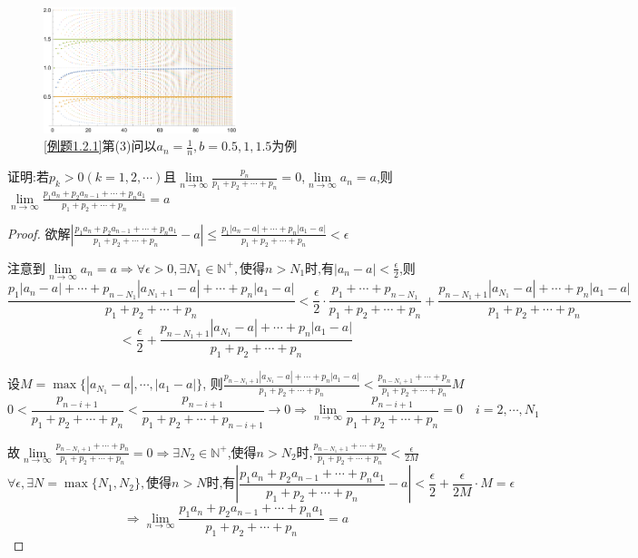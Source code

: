 \begin{figure}[H]
    \centering
    \includegraphics[width=0.5\textwidth]{../image/点列问题}
    \caption{\cref{例题1.2.1}第(3)问以$a_n=\frac{1}{n},b=0.5,1,1.5$为例}
\end{figure}

\begin{example}
    证明:若$p_k>0(k=1,2,\cdots)$且$\lim\limits_{n\to \infty}\frac{p_n}{p_1+p_2+\cdots+p_n}=0$,$\lim\limits_{n \to \infty} a_n=a$,则$\lim\limits_{n\to \infty}\frac{p_1a_n+p_2a_{n-1}+\cdots+p_na_1}{p_1+p_2+\cdots+p_n}=a$
\end{example}

\begin{proof}

    欲解$|\frac{p_1a_n+p_2a_{n-1}+\cdots+p_na_1}{p_1+p_2+\cdots+p_n}-a|\le \frac{p_1|a_n-a|+\cdots+p_n|a_1-a|}{p_1+p_2+\cdots+p_n}<\epsilon$

    注意到$\lim\limits_{n\to \infty} a_n=a \Longrightarrow\forall \epsilon>0,\exists N_1 \in \mathbb{N}^+,\mbox{使得}n>N_1\mbox{时,有}|a_n-a|<\frac{\epsilon}{2}$,则
    $$\frac{p_1|a_n-a|+\cdots+p_{n-N_1}|a_{N_1+1}-a|+\cdots+p_n|a_1-a|}{p_1+p_2+\cdots+p_n}< \frac{\epsilon}{2}\cdot \frac{p_1+\cdots+p_{n-N_1}}{p_1+p_2+\cdots+p_n}+\frac{p_{n-N_1+1}|a_{N_1}-a|+\cdots+p_n|a_1-a|}{p_1+p_2+\cdots+p_n}$$
    $$<\frac{\epsilon}{2}+\frac{p_{n-N_1+1}|a_{N_1}-a|+\cdots+p_n|a_1-a|}{p_1+p_2+\cdots+p_n}$$

    设$M=\max \{|a_{N_1}-a|,\cdots,|a_1-a|\}$,
    则$\frac{p_{n-N_1+1}|a_{N_1}-a|+\cdots+p_n|a_1-a|}{p_1+p_2+\cdots+p_n}<\frac{p_{n-N_1+1}+\cdots+p_n}{p_1+p_2+\cdots+p_n}M$
    \begin{equation*}
        0<\frac{p_{n-i+1}}{p_1+p_2+\cdots+p_n}<\frac{p_{n-i+1}}{p_1+p_2+\cdots+p_{n-i+1}}\to 0\Longrightarrow \lim\limits_{n\to \infty}\frac{p_{n-i+1}}{p_1+p_2+\cdots+p_n}=0\quad i=2,\cdots,N_1
    \end{equation*}

    故$\lim\limits_{n\to \infty} \frac{p_{n-N_1+1}+\cdots+p_n}{p_1+p_2+\cdots+p_n} = 0
        \Longrightarrow
        \exists N_2\in \mathbb{N}^+$,使得$n>N_2$时,$\frac{p_{n-N_1+1}+\cdots+p_n}{p_1+p_2+\cdots+p_n}<\frac{\epsilon}{2M}$
    $$\forall \epsilon,\exists N=\max \{N_1,N_2\},\mbox{使得}n>N\mbox{时,有}|\frac{p_1a_n+p_2a_{n-1}+\cdots+p_na_1}{p_1+p_2+\cdots+p_n}-a|<\frac{\epsilon}{2}+\frac{\epsilon}{2M}\cdot M=\epsilon$$
    $$\Longrightarrow \lim\limits_{n\to \infty}\frac{p_1a_n+p_2a_{n-1}+\cdots+p_na_1}{p_1+p_2+\cdots+p_n}=a$$
\end{proof}

